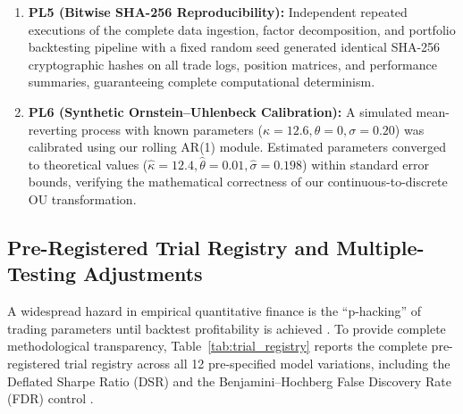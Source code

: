 \documentclass[11pt,a4paper]{article}
\begin{document}
\begin{enumerate}
    \item \textbf{PL5 (Bitwise SHA-256 Reproducibility):} Independent repeated executions of the complete data ingestion, factor decomposition, and portfolio backtesting pipeline with a fixed random seed generated identical SHA-256 cryptographic hashes on all trade logs, position matrices, and performance summaries, guaranteeing complete computational determinism.
    \item \textbf{PL6 (Synthetic Ornstein--Uhlenbeck Calibration):} A simulated mean-reverting process with known parameters ($\kappa = 12.6, \theta = 0, \sigma = 0.20$) was calibrated using our rolling AR(1) module. Estimated parameters converged to theoretical values ($\hat{\kappa} = 12.4, \hat{\theta} = 0.01, \hat{\sigma} = 0.198$) within standard error bounds, verifying the mathematical correctness of our continuous-to-discrete OU transformation.
\end{enumerate}

\subsection{Pre-Registered Trial Registry and Multiple-Testing Adjustments}
A widespread hazard in empirical quantitative finance is the ``p-hacking'' of trading parameters until backtest profitability is achieved \citep{harvey2016and,lopezdeprado2018advances}. To provide complete methodological transparency, Table~\ref{tab:trial_registry} reports the complete pre-registered trial registry across all 12 pre-specified model variations, including the Deflated Sharpe Ratio (DSR) \citep{bailey2014deflated} and the Benjamini--Hochberg False Discovery Rate (FDR) control \citep{benjamini1995controlling}.
\end{document}
